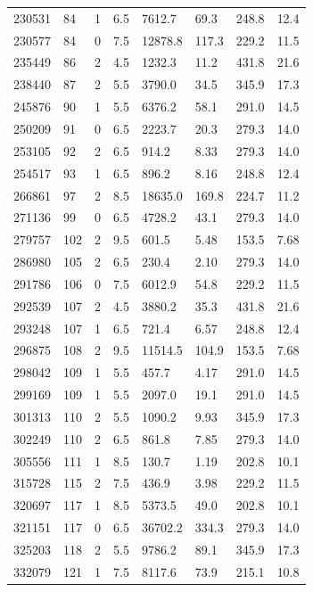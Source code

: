 \documentclass[preview]{standalone}
\begin{document}
{{{\begin{tabular}{L{1.2cm}C{1.2cm} C{0.3cm}C{0.5cm} C{1.4cm}C{1.4cm} C{1.4cm}C{1.4cm}}
  230531  &    84  & 1     & 6.5 &  7612.7  & 69.3  & 248.8 &  12.4   \\ 
  230577  &    84  & 0     & 7.5 &  12878.8  & 117.3  & 229.2 &  11.5   \\ 
  235449  &    86  & 2     & 4.5 &  1232.3  & 11.2  & 431.8 &  21.6   \\ 
  238440  &    87  & 2     & 5.5 &  3790.0  & 34.5  & 345.9 &  17.3   \\ 
  245876  &    90  & 1     & 5.5 &  6376.2  & 58.1  & 291.0 &  14.5   \\ 
  250209  &    91  & 0     & 6.5 &  2223.7  & 20.3  & 279.3 &  14.0   \\ 
  253105  &    92  & 2     & 6.5 &  914.2  & 8.33  & 279.3 &  14.0   \\ 
  254517  &    93  & 1     & 6.5 &  896.2  & 8.16  & 248.8 &  12.4   \\ 
  266861  &    97  & 2     & 8.5 &  18635.0  & 169.8  & 224.7 &  11.2   \\ 
  271136  &    99  & 0     & 6.5 &  4728.2  & 43.1  & 279.3 &  14.0   \\ 
  279757  &   102  & 2     & 9.5 &  601.5  & 5.48  & 153.5 &  7.68   \\ 
  286980  &   105  & 2     & 6.5 &  230.4  & 2.10  & 279.3 &  14.0   \\ 
  291786  &   106  & 0     & 7.5 &  6012.9  & 54.8  & 229.2 &  11.5   \\ 
  292539  &   107  & 2     & 4.5 &  3880.2  & 35.3  & 431.8 &  21.6   \\ 
  293248  &   107  & 1     & 6.5 &  721.4  & 6.57  & 248.8 &  12.4   \\ 
  296875  &   108  & 2     & 9.5 &  11514.5  & 104.9  & 153.5 &  7.68   \\ 
  298042  &   109  & 1     & 5.5 &  457.7  & 4.17  & 291.0 &  14.5   \\ 
  299169  &   109  & 1     & 5.5 &  2097.0  & 19.1  & 291.0 &  14.5   \\ 
  301313  &   110  & 2     & 5.5 &  1090.2  & 9.93  & 345.9 &  17.3   \\ 
  302249  &   110  & 2     & 6.5 &  861.8  & 7.85  & 279.3 &  14.0   \\ 
  305556  &   111  & 1     & 8.5 &  130.7  & 1.19  & 202.8 &  10.1   \\ 
  315728  &   115  & 2     & 7.5 &  436.9  & 3.98  & 229.2 &  11.5   \\ 
  320697  &   117  & 1     & 8.5 &  5373.5  & 49.0  & 202.8 &  10.1   \\ 
  321151  &   117  & 0     & 6.5 &  36702.2  & 334.3  & 279.3 &  14.0   \\ 
  325203  &   118  & 2     & 5.5 &  9786.2  & 89.1  & 345.9 &  17.3   \\ 
  332079  &   121  & 1     & 7.5 &  8117.6  & 73.9  & 215.1 &  10.8   \\ 
\hline 
\end{tabular} 

}}}
\end{document}
